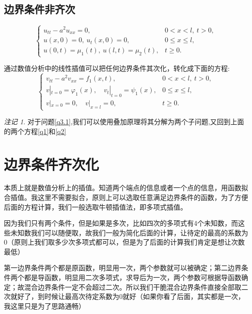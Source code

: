 \documentclass[12pt,a4paper]{article}
\numberwithin{subsection}{section}   %
\numberwithin{subsubsection}{subsection}
\theoremstyle{plain}
\theoremstyle{definition}
\theoremstyle{remark}
\newtheorem{remark}[theorem]{注记}
\theoremstyle{remark}
\begin{document}
	
	\subsection{边界条件非齐次}
	\begin{equation}\label{q3}
		\begin{cases}
			u_{tt} - a^2 u_{xx} = 0, & 0 < x < l, \ t > 0, \\
			u(x, 0) = 0, \ u_t(x, 0) = 0, & 0 \leq x \leq l, \\
			u(0, t) = \mu_1(t), \ u(l, t) = \mu_2(t), & t \geq 0.
		\end{cases}
	\end{equation}	
	
	通过数值分析中的线性插值可以把任何边界条件其次化，转化成下面的方程:
	\begin{equation}\label{q3.1}
	\begin{cases}
		v_{tt} - a^2 v_{xx} = f_1(x, t), & 0 < x < l, \ t > 0, \\
		v|_{t=0} = \varphi_1(x), \quad v_t|_{t=0} = \psi_1(x), & 0 \leq x \leq l, \\
		v|_{x=0} = 0, \quad v|_{x=l} = 0, & t \geq 0.
	\end{cases}
\end{equation}
	
	
	\begin{remark}
	对于问题\eqref{q3.1},我们可以使用叠加原理将其分解为两个子问题,又回到上面的两个方程\eqref{q1}和\eqref{q2}
\end{remark}

	

	
	\newpage
	
		\section{边界条件齐次化}
		本质上就是数值分析上的插值。知道两个端点的信息或者一个点的信息，用函数拟合插值。我这里不需要拟合，原则上可以选取任意满足边界条件的函数，为了方便后面的方程计算，我们一般选取牛顿插值法，即多项式插值。	
		
		因为我们只有两个条件，但是如果是多次，比如四次的多项式有4个未知数，而这些未知数我们可以随便取，故我们一般为简化后面的计算，让待定的最高的系数为0（原则上我们取多少次多项式都可以，但是为了后面的计算我们肯定是想让次数最低）
		
		第一边界条件两个都是原函数，明显用一次，两个参数就可以被确定；第二边界条件两个都是导函数，明显用二次多项式，求导后为一次，两个参数可根据导函数确定；故混合边界条件一定不会超过二次。所以我们干脆混合边界条件直接全部取二次就好了，到时候让最高次待定系数为0就好（如果你看了后面，其实都是一次，我这里只是为了思路通畅）
\end{document}
